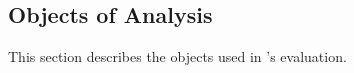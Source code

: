 \documentclass[sigconf,review, anonymous]{acmart}
\begin{document}

\newcommand{\numNonContentAttacks}{4}
\newcommand{\numContentAttacks}{10}

\subsection{Objects of Analysis}
\label{sec:dataset-benign}
\label{attack-reproduction}

This section describes the objects used in \tname{}'s evaluation.

\vspace{1ex}
\end{document}
